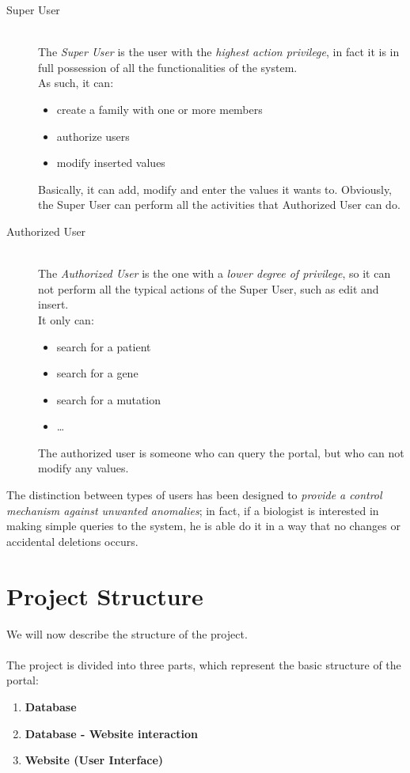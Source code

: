 \begin{description}
  \item[Super User] \hfill \\
  The \emph{Super User} is the user with the \emph{highest action privilege}, in fact it is in full possession of all the functionalities of the system.
\\As such, it can:
		\begin{itemize}
  		\item create a family with one or more members
 		 \item authorize users
 		 \item modify inserted values
		\end{itemize}
Basically, it can add, modify and enter the values it wants to. Obviously, the Super User can perform all the activities that Authorized User can do.
\\
  \item[Authorized User] \hfill \\
The \emph{Authorized User} is the one with a \emph{lower degree of privilege}, so it can not perform all the typical actions of the Super User, such as edit and insert. 
\\It only can:
		\begin{itemize}
  		\item search for a patient
		\item search for a gene
		\item search for a mutation
		\item \ldots
		\end{itemize}
The authorized user is someone who can query the portal, but who can not modify any values​​.
\\
\end{description}
The distinction between types of users has been designed to \emph{provide a control mechanism against unwanted anomalies}; in fact, if a biologist is interested in making simple queries to the system, he is able do it in a way that no changes or accidental deletions occurs.

\section{Project Structure}
We will now describe the structure of the project.
\\
\\The project is divided into three parts, which represent the basic structure of the portal:
\begin{enumerate}
  \item \textbf{Database}
  \item \textbf{Database - Website interaction}
  \item \textbf{Website (User Interface)}
\end{enumerate}

